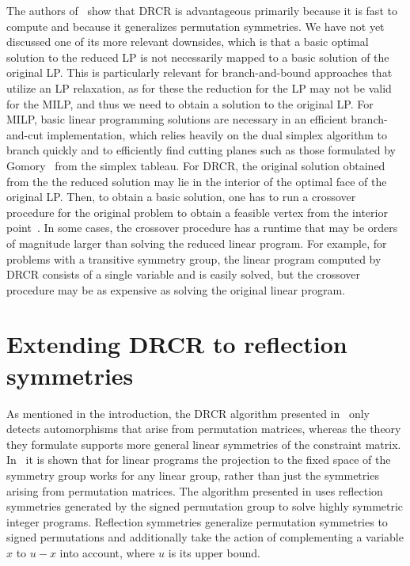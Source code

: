 \documentclass[pdflatex,sn-mathphys-num]{sn-jnl}%
\theoremstyle{thmstyleone}%
\theoremstyle{thmstylethree}%
\theoremstyle{thmstyletwo}%
\begin{document}
The authors of~\cite{Grohe2014} show that DRCR is advantageous primarily because it is fast to compute and because it generalizes permutation symmetries. We have not yet discussed one of its more relevant downsides, which is that a basic optimal solution to the reduced LP is not necessarily mapped to a basic solution of the original LP. This is particularly relevant for branch-and-bound approaches that utilize an LP relaxation, as for these the reduction for the LP may not be valid for the MILP, and thus we need to obtain a solution to the original LP. For MILP, basic linear programming solutions are necessary in an efficient branch-and-cut implementation, which relies heavily on the dual simplex algorithm to branch quickly and to efficiently find cutting planes such as those formulated by Gomory~\cite{Gomory60} from the simplex tableau.
For DRCR, the original solution obtained from the the reduced solution may lie in the interior of the optimal face of the original LP. Then, to obtain a basic solution, one has to run a crossover procedure for the original problem to obtain a feasible vertex from the interior point~\cite{Megiddo1991}. In some cases, the crossover procedure has a runtime that may be orders of magnitude larger than solving the reduced linear program. For example, for problems with a transitive symmetry group, the linear program computed by DRCR consists of a single variable and is easily solved, but the crossover procedure may be as expensive as solving the original linear program. 

\section{Extending DRCR to reflection symmetries}

\label{sec_reflection_symmetry}
As mentioned in the introduction, the DRCR algorithm presented in~\cite{Grohe2014} only detects automorphisms that arise from permutation matrices, whereas the theory they formulate supports more general linear symmetries of the constraint matrix. In~\cite{Bodi2013} it is shown that for linear programs the projection to the fixed space of the symmetry group works for any linear group, rather than just the symmetries arising from permutation matrices. The algorithm presented in \cite{Bodi2013} uses reflection symmetries generated by the signed permutation group to solve highly symmetric integer programs. Reflection symmetries generalize permutation symmetries to signed permutations and additionally take the action of complementing a variable $x$ to $u-x$ into account, where $u$ is its upper bound. \\
\end{document}
